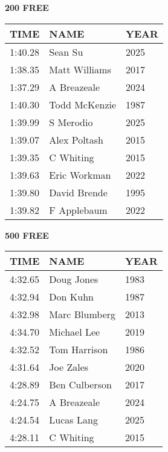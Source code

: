 \vspace{0.4cm}

\begin{minipage}[t]{0.48\textwidth}
\centering
\textbf{200 FREE}\\[0.05cm]
\begin{tabular}{@{}p{1.8cm}p{2.8cm}p{1.2cm}@{}}
\hline
\textbf{TIME} & \textbf{NAME} & \textbf{YEAR} \\
\hline
1:40.28 & Sean Su & 2025 \\
1:38.35 & Matt Williams & 2017 \\
1:37.29 & A Breazeale & 2024 \\
1:40.30 & Todd McKenzie & 1987 \\
1:39.99 & S Merodio & 2025 \\
1:39.07 & Alex Poltash & 2015 \\
1:39.35 & C Whiting & 2015 \\
1:39.63 & Eric Workman & 2022 \\
1:39.80 & David Brende & 1995 \\
1:39.82 & F Applebaum & 2022 \\
\hline
\end{tabular}
\end{minipage}\hfill
\begin{minipage}[t]{0.48\textwidth}
\centering
\textbf{500 FREE}\\[0.05cm]
\begin{tabular}{@{}p{1.8cm}p{2.8cm}p{1.2cm}@{}}
\hline
\textbf{TIME} & \textbf{NAME} & \textbf{YEAR} \\
\hline
4:32.65 & Doug Jones & 1983 \\
4:32.94 & Don Kuhn & 1987 \\
4:32.98 & Marc Blumberg & 2013 \\
4:34.70 & Michael Lee & 2019 \\
4:32.52 & Tom Harrison & 1986 \\
4:31.64 & Joe Zales & 2020 \\
4:28.89 & Ben Culberson & 2017 \\
4:24.75 & A Breazeale & 2024 \\
4:24.54 & Lucas Lang & 2025 \\
4:28.11 & C Whiting & 2015 \\
\hline
\end{tabular}
\end{minipage}

\vspace{0.4cm}

